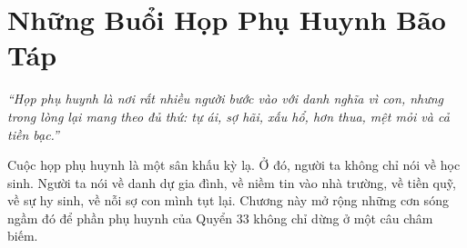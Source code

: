 \chapter{Những Buổi Họp Phụ Huynh Bão Táp}

\begin{center}
	\textit{\color{bookprimary}``Họp phụ huynh là nơi rất nhiều người bước vào với danh nghĩa vì con, nhưng trong lòng lại mang theo đủ thứ: tự ái, sợ hãi, xấu hổ, hơn thua, mệt mỏi và cả tiền bạc.''}
\end{center}

\ngancach

\begin{tcolorbox}[
	colback=booktext!5,
	colframe=booktext!35,
	arc=5pt,
	title={\bfseries Trục Của Chương},
	fonttitle=\bfseries\color{booktext}
]
Cuộc họp phụ huynh là một sân khấu kỳ lạ. Ở đó, người ta không chỉ nói về học sinh. Người ta nói về danh dự gia đình, về niềm tin vào nhà trường, về tiền quỹ, về sự hy sinh, về nỗi sợ con mình tụt lại. Chương này mở rộng những cơn sóng ngầm đó để phần phụ huynh của Quyển 33 không chỉ dừng ở một câu châm biếm.
\end{tcolorbox}

